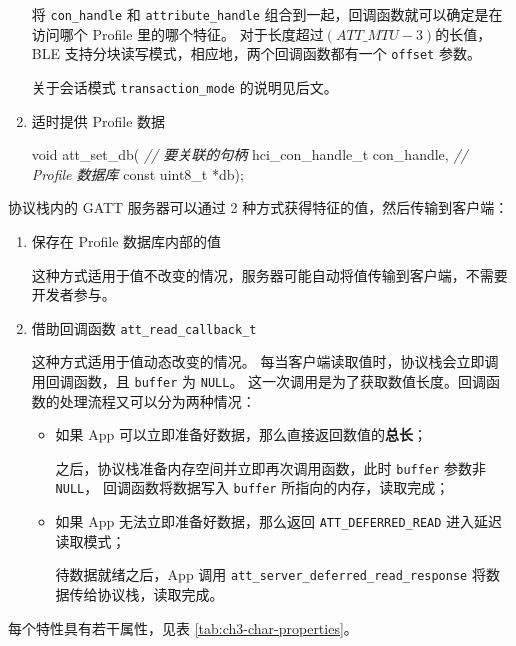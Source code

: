 \documentclass[
  12pt,
]{book}
\newenvironment{Shaded}{\begin{snugshade}}{\end{snugshade}}
\newcommand{\CommentTok}[1]{\textcolor[rgb]{0.56,0.35,0.01}{\textit{#1}}}
\newcommand{\DataTypeTok}[1]{\textcolor[rgb]{0.13,0.29,0.53}{#1}}
\newcommand{\NormalTok}[1]{#1}
\begin{document}
\begin{enumerate}
  将 \texttt{con\_handle} 和 \texttt{attribute\_handle} 组合到一起，回调函数就可以确定是在访问哪个 Profile 里的哪个特征。
  对于长度超过\((ATT\_MTU - 3)\)的长值，BLE 支持分块读写模式，相应地，两个回调函数都有一个 \texttt{offset} 参数。

  关于会话模式 \texttt{transaction\_mode} 的说明见后文。
\item
  适时提供 Profile 数据

\begin{Shaded}
\begin{Highlighting}[]
\DataTypeTok{void}\NormalTok{ att_set_db(}
  \CommentTok{// 要关联的句柄}
\NormalTok{  hci_con_handle_t con_handle,}
  \CommentTok{// Profile 数据库}
  \DataTypeTok{const} \DataTypeTok{uint8_t}\NormalTok{ *db);}
\end{Highlighting}
\end{Shaded}
\end{enumerate}

协议栈内的 GATT 服务器可以通过 2 种方式获得特征的值，然后传输到客户端：

\begin{enumerate}
\def\labelenumi{\arabic{enumi}.}
\item
  保存在 Profile 数据库内部的值

  这种方式适用于值不改变的情况，服务器可能自动将值传输到客户端，不需要开发者参与。
\item
  借助回调函数 \texttt{att\_read\_callback\_t}

  这种方式适用于值动态改变的情况。
  每当客户端读取值时，协议栈会立即调用回调函数，且 \texttt{buffer} 为 \texttt{NULL}。
  这一次调用是为了获取数值长度。回调函数的处理流程又可以分为两种情况：

  \begin{itemize}
  \item
    如果 App 可以立即准备好数据，那么直接返回数值的\textbf{总长}；

    之后，协议栈准备内存空间并立即再次调用函数，此时 \texttt{buffer} 参数非 \texttt{NULL}，
    回调函数将数据写入 \texttt{buffer} 所指向的内存，读取完成；
  \item
    如果 App 无法立即准备好数据，那么返回 \texttt{ATT\_DEFERRED\_READ} 进入延迟读取模式；

    待数据就绪之后，App 调用 \texttt{att\_server\_deferred\_read\_response} 将数据传给协议栈，读取完成。
  \end{itemize}
\end{enumerate}

每个特性具有若干属性，见表 \ref{tab:ch3-char-properties}。
\end{document}
